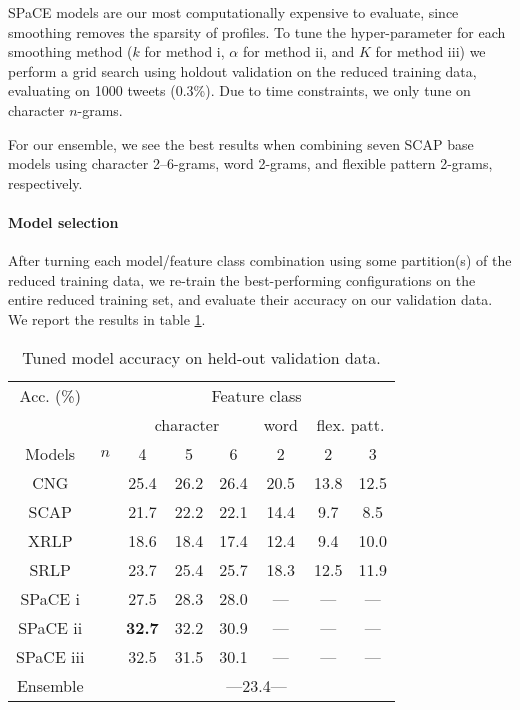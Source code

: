 \documentclass[twocolumn,10pt]{article}
\begin{document}
SPaCE models are our most computationally expensive to evaluate,
since smoothing removes the sparsity of profiles.
To tune the hyper-parameter for each smoothing method
($k$ for method i, $\alpha$ for method ii, and $K$ for method iii)
we perform a grid search using holdout validation on the reduced training
data, evaluating on 1000 tweets (0.3\%).
Due to time constraints, we only tune on character $n$-grams.

For our ensemble, we see the best results when combining
seven SCAP base models using character 2--6-grams,
word 2-grams, and flexible pattern 2-grams, respectively.


\paragraph{Model selection}
After turning each model/feature class combination using some 
partition(s) of the reduced training data, we re-train the
best-performing configurations on the entire reduced training set,
and evaluate their accuracy on our validation data.
We report the results in table \ref{tab:devresults}.




\begin{table}[h]
\centering
\begin{tabular}{@{}cccccccc@{}}
\cmidrule{3-8}
Acc. (\%)   &     & \multicolumn{6}{c}{Feature class}                    \\
\cmidrule{3-8} 
            &     & \multicolumn{3}{c}{character} & word  & \multicolumn{2}{c}{flex. patt.} \\
\cmidrule(r){1-1} \cmidrule(rl){3-5} \cmidrule(rl){6-6} \cmidrule(rl){7-8} 
Models      & $n$ & 4      & 5      & 6           & 2     & 2     & 3    \\
\cmidrule(r){1-1} \cmidrule{3-8} 
CNG         &     & 25.4   & 26.2   & 26.4        & 20.5  & 13.8  & 12.5 \\
SCAP        &     & 21.7   & 22.2   & 22.1        & 14.4  &  9.7  &  8.5 \\
XRLP        &     & 18.6   & 18.4   & 17.4        & 12.4  &  9.4  & 10.0 \\
SRLP        &     & 23.7   & 25.4   & 25.7        & 18.3  & 12.5  & 11.9 \\
SPaCE i     &     & 27.5   & 28.3   & 28.0        & ---   & ---   & ---  \\
SPaCE ii    & &{\bf 32.7}  & 32.2   & 30.9        & ---   & ---   & ---  \\
SPaCE iii   &     & 32.5   & 31.5   & 30.1        & ---   & ---   & ---  \\
                  \cmidrule{3-8} 
Ensemble    &     & \multicolumn{6}{c}{ ---23.4--- }\\ %
\bottomrule
\end{tabular}
\caption{Tuned model accuracy on held-out validation data.}
\label{tab:devresults}
\end{table}
\end{document}
